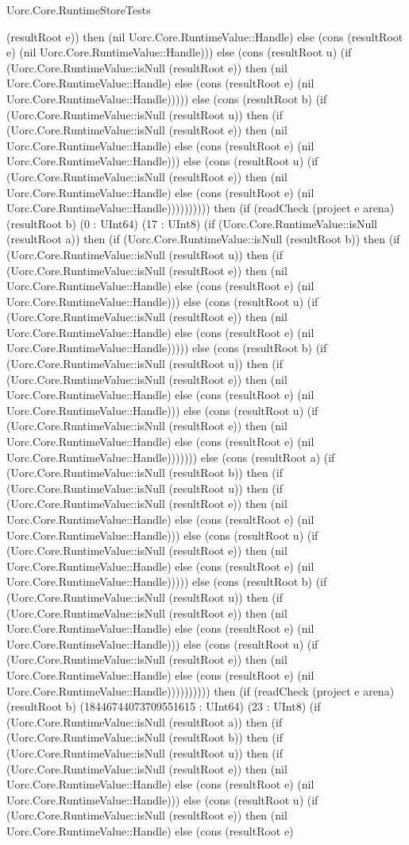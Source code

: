 \begin{lexlean}{Uorc.Core.RuntimeStoreTests}
\begin{semanticmodule}
{(resultRoot e)) then (nil Uorc.Core.RuntimeValue::Handle) else (cons (resultRoot e) (nil Uorc.Core.RuntimeValue::Handle))) else (cons (resultRoot u) (if (Uorc.Core.RuntimeValue::isNull (resultRoot e)) then (nil Uorc.Core.RuntimeValue::Handle) else (cons (resultRoot e) (nil Uorc.Core.RuntimeValue::Handle))))) else (cons (resultRoot b) (if (Uorc.Core.RuntimeValue::isNull (resultRoot u)) then (if (Uorc.Core.RuntimeValue::isNull (resultRoot e)) then (nil Uorc.Core.RuntimeValue::Handle) else (cons (resultRoot e) (nil Uorc.Core.RuntimeValue::Handle))) else (cons (resultRoot u) (if (Uorc.Core.RuntimeValue::isNull (resultRoot e)) then (nil Uorc.Core.RuntimeValue::Handle) else (cons (resultRoot e) (nil Uorc.Core.RuntimeValue::Handle)))))))))) then (if (readCheck (project e arena) (resultRoot b) (0 : UInt64) (17 : UInt8) (if (Uorc.Core.RuntimeValue::isNull (resultRoot a)) then (if (Uorc.Core.RuntimeValue::isNull (resultRoot b)) then (if (Uorc.Core.RuntimeValue::isNull (resultRoot u)) then (if (Uorc.Core.RuntimeValue::isNull (resultRoot e)) then (nil Uorc.Core.RuntimeValue::Handle) else (cons (resultRoot e) (nil Uorc.Core.RuntimeValue::Handle))) else (cons (resultRoot u) (if (Uorc.Core.RuntimeValue::isNull (resultRoot e)) then (nil Uorc.Core.RuntimeValue::Handle) else (cons (resultRoot e) (nil Uorc.Core.RuntimeValue::Handle))))) else (cons (resultRoot b) (if (Uorc.Core.RuntimeValue::isNull (resultRoot u)) then (if (Uorc.Core.RuntimeValue::isNull (resultRoot e)) then (nil Uorc.Core.RuntimeValue::Handle) else (cons (resultRoot e) (nil Uorc.Core.RuntimeValue::Handle))) else (cons (resultRoot u) (if (Uorc.Core.RuntimeValue::isNull (resultRoot e)) then (nil Uorc.Core.RuntimeValue::Handle) else (cons (resultRoot e) (nil Uorc.Core.RuntimeValue::Handle))))))) else (cons (resultRoot a) (if (Uorc.Core.RuntimeValue::isNull (resultRoot b)) then (if (Uorc.Core.RuntimeValue::isNull (resultRoot u)) then (if (Uorc.Core.RuntimeValue::isNull (resultRoot e)) then (nil Uorc.Core.RuntimeValue::Handle) else (cons (resultRoot e) (nil Uorc.Core.RuntimeValue::Handle))) else (cons (resultRoot u) (if (Uorc.Core.RuntimeValue::isNull (resultRoot e)) then (nil Uorc.Core.RuntimeValue::Handle) else (cons (resultRoot e) (nil Uorc.Core.RuntimeValue::Handle))))) else (cons (resultRoot b) (if (Uorc.Core.RuntimeValue::isNull (resultRoot u)) then (if (Uorc.Core.RuntimeValue::isNull (resultRoot e)) then (nil Uorc.Core.RuntimeValue::Handle) else (cons (resultRoot e) (nil Uorc.Core.RuntimeValue::Handle))) else (cons (resultRoot u) (if (Uorc.Core.RuntimeValue::isNull (resultRoot e)) then (nil Uorc.Core.RuntimeValue::Handle) else (cons (resultRoot e) (nil Uorc.Core.RuntimeValue::Handle)))))))))) then (if (readCheck (project e arena) (resultRoot b) (18446744073709551615 : UInt64) (23 : UInt8) (if (Uorc.Core.RuntimeValue::isNull (resultRoot a)) then (if (Uorc.Core.RuntimeValue::isNull (resultRoot b)) then (if (Uorc.Core.RuntimeValue::isNull (resultRoot u)) then (if (Uorc.Core.RuntimeValue::isNull (resultRoot e)) then (nil Uorc.Core.RuntimeValue::Handle) else (cons (resultRoot e) (nil Uorc.Core.RuntimeValue::Handle))) else (cons (resultRoot u) (if (Uorc.Core.RuntimeValue::isNull (resultRoot e)) then (nil Uorc.Core.RuntimeValue::Handle) else (cons (resultRoot e) }
\end{semanticmodule}
\end{lexlean}
